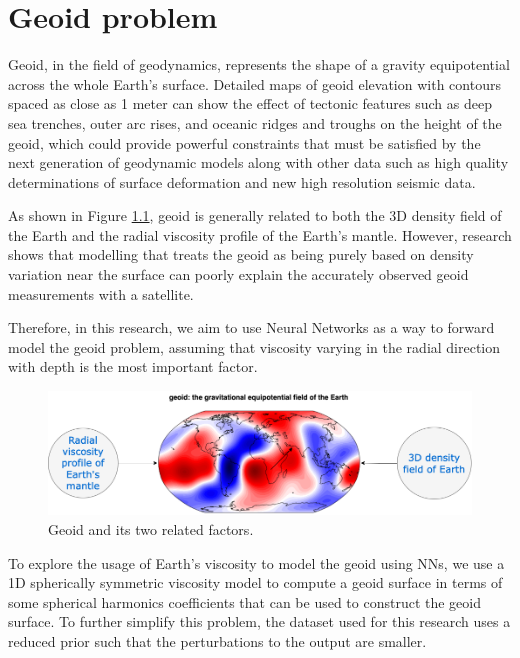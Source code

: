 \chapter{Geoid problem}\label{chap:content}

Geoid, in the field of geodynamics, represents the shape of a gravity equipotential across the whole Earth's surface. Detailed maps of geoid elevation with contours spaced as close as 1 meter can show the effect of tectonic features such as deep sea trenches, outer arc rises, and oceanic ridges and troughs on the height of the geoid, which could provide powerful constraints that must be satisfied by the next generation of geodynamic models along with other data such as high quality determinations of surface deformation and new high resolution seismic data. \citep{10.1038_299104a0}

As shown in Figure \ref{figure:geoid_factors}, geoid is generally related to both the 3D density field of the Earth and the radial viscosity profile of the Earth's mantle. However, research shows that modelling that treats the geoid as being purely based on density variation near the surface can poorly explain the accurately observed geoid measurements with a satellite. \citep{10.1098_rsta.1989.0038}

Therefore, in this research, we aim to use Neural Networks as a way to forward model the geoid problem, assuming that viscosity varying in the radial direction with depth is the most important factor.

\begin{figure}[H]
    \centering
    \includegraphics[scale=0.4]{figures/geoid_images/Geoid.png}
    \caption{Geoid and its two related factors.}
    \label{figure:geoid_factors}
\end{figure}

To explore the usage of Earth's viscosity to model the geoid using NNs, we use a 1D spherically symmetric viscosity model to compute a geoid surface in terms of some spherical harmonics coefficients that can be used to construct the geoid surface.\citep{10.1029_jb089ib07p05987} To further simplify this problem, the dataset used for this research uses a reduced prior such that the perturbations to the output are smaller.


